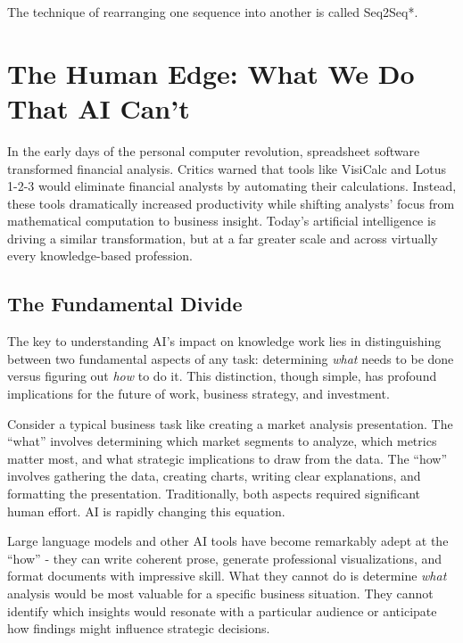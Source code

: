 \documentclass[
  Letterpaper,
]{scrbook}
\begin{document}
The technique of rearranging one sequence into another is called
Seq2Seq*.


\chapter{The Human Edge: What We Do That AI
Can't}\label{the-human-edge-what-we-do-that-ai-cant}

In the early days of the personal computer revolution, spreadsheet
software transformed financial analysis. Critics warned that tools like
VisiCalc and Lotus 1-2-3 would eliminate financial analysts by
automating their calculations. Instead, these tools dramatically
increased productivity while shifting analysts' focus from mathematical
computation to business insight. Today's artificial intelligence is
driving a similar transformation, but at a far greater scale and across
virtually every knowledge-based profession.

\section{The Fundamental Divide}\label{the-fundamental-divide}

The key to understanding AI's impact on knowledge work lies in
distinguishing between two fundamental aspects of any task: determining
\emph{what} needs to be done versus figuring out \emph{how} to do it.
This distinction, though simple, has profound implications for the
future of work, business strategy, and investment.

Consider a typical business task like creating a market analysis
presentation. The ``what'' involves determining which market segments to
analyze, which metrics matter most, and what strategic implications to
draw from the data. The ``how'' involves gathering the data, creating
charts, writing clear explanations, and formatting the presentation.
Traditionally, both aspects required significant human effort. AI is
rapidly changing this equation.

Large language models and other AI tools have become remarkably adept at
the ``how'' - they can write coherent prose, generate professional
visualizations, and format documents with impressive skill. What they
cannot do is determine \emph{what} analysis would be most valuable for a
specific business situation. They cannot identify which insights would
resonate with a particular audience or anticipate how findings might
influence strategic decisions.
\end{document}
